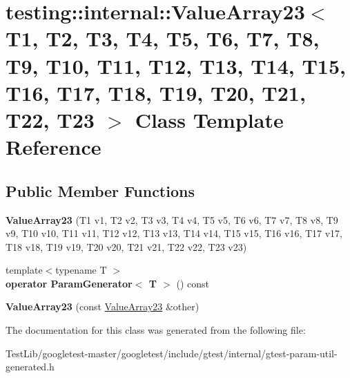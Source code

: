 \hypertarget{classtesting_1_1internal_1_1ValueArray23}{}\section{testing\+:\+:internal\+:\+:Value\+Array23$<$ T1, T2, T3, T4, T5, T6, T7, T8, T9, T10, T11, T12, T13, T14, T15, T16, T17, T18, T19, T20, T21, T22, T23 $>$ Class Template Reference}
\label{classtesting_1_1internal_1_1ValueArray23}
\subsection*{Public Member Functions}
\begin{DoxyCompactItemize}
\item 
\mbox{\label{classtesting_1_1internal_1_1ValueArray23_a39a294eac1033599b11fde99d8c211ac}} 
{\bfseries Value\+Array23} (T1 v1, T2 v2, T3 v3, T4 v4, T5 v5, T6 v6, T7 v7, T8 v8, T9 v9, T10 v10, T11 v11, T12 v12, T13 v13, T14 v14, T15 v15, T16 v16, T17 v17, T18 v18, T19 v19, T20 v20, T21 v21, T22 v22, T23 v23)
\item 
\mbox{\label{classtesting_1_1internal_1_1ValueArray23_a667a3e2676bba0d87007e2b1425431c6}} 
{\footnotesize template$<$typename T $>$ }\\{\bfseries operator Param\+Generator$<$ T $>$} () const
\item 
\mbox{\label{classtesting_1_1internal_1_1ValueArray23_ae953048d6022e967bc710419068f6cb7}} 
{\bfseries Value\+Array23} (const \hyperlink{classtesting_1_1internal_1_1ValueArray23}{Value\+Array23} \&other)
\end{DoxyCompactItemize}


The documentation for this class was generated from the following file\+:\begin{DoxyCompactItemize}
\item 
Test\+Lib/googletest-\/master/googletest/include/gtest/internal/gtest-\/param-\/util-\/generated.\+h\end{DoxyCompactItemize}
